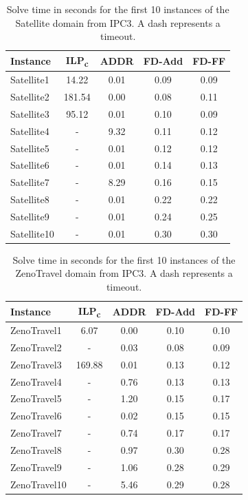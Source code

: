 \begin{table}[p]
    \centering
    \begin{tabular}{lcccc}
        \hline
        \textbf{Instance} & \textbf{ILP\textsubscript{c}} & \textbf{ADDR} & \textbf{FD-Add} & \textbf{FD-FF} \\ 
        \hline
        Satellite1 & 14.22 & 0.01 & 0.09 & 0.09\\ 
        Satellite2 & 181.54 & 0.00 & 0.08 & 0.11\\ 
        Satellite3 & 95.12 & 0.01 & 0.10 & 0.09\\ 
        Satellite4 & - & 9.32 & 0.11 & 0.12\\ 
        Satellite5 & - & 0.01 & 0.12 & 0.12 \\ 
        Satellite6 & - & 0.01 & 0.14 & 0.13\\ 
        Satellite7 & - & 8.29 & 0.16 & 0.15 \\ 
        Satellite8 & - & 0.01 & 0.22 & 0.22\\ 
        Satellite9 & - & 0.01 & 0.24 & 0.25 \\ 
        Satellite10 & - & 0.01 & 0.30 & 0.30\\ 
        \hline
    \end{tabular}
    \caption{Solve time in seconds for the first 10 instances of the Satellite domain from IPC3. A dash represents a timeout.}
    \label{fig:satelliteTime}
\end{table}


\begin{table}[p]
    \centering
    \begin{tabular}{lcccc}
        \hline
        \textbf{Instance} & \textbf{ILP\textsubscript{c}} & \textbf{ADDR} & \textbf{FD-Add} & \textbf{FD-FF} \\ 
        \hline
        ZenoTravel1 & 6.07 & 0.00 & 0.10 & 0.10\\ 
        ZenoTravel2 & - & 0.03 & 0.08 & 0.09\\ 
        ZenoTravel3 & 169.88 & 0.01 & 0.13 & 0.12\\ 
        ZenoTravel4 & - & 0.76 & 0.13 & 0.13\\ 
        ZenoTravel5 & - & 1.20 & 0.15 & 0.17\\ 
        ZenoTravel6 & - & 0.02 & 0.15 & 0.15\\ 
        ZenoTravel7 & - & 0.74 & 0.17 & 0.17\\ 
        ZenoTravel8 & - & 0.97 & 0.30 & 0.28\\ 
        ZenoTravel9 & - & 1.06 & 0.28 & 0.29\\ 
        ZenoTravel10 & - & 5.46 & 0.29 & 0.28\\ 
        \hline
    \end{tabular}
    \caption{Solve time in seconds for the first 10 instances of the ZenoTravel domain from IPC3. A dash represents a timeout.}
    \label{fig:zenoTravelTime}
\end{table}


